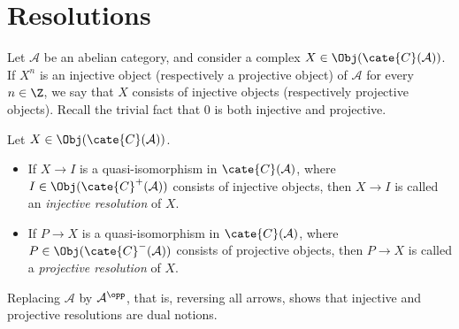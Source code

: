 
\section{Resolutions}\label{sec:resolutions}
\hypertarget{o014.aljabr2.chapter3.resolutions}{ }

Let $\mathcal{A}$ be an abelian category, and consider a complex
$X\in\Obj(\cate{C}(\mathcal{A}))$. If $X^n$ is an injective object
(respectively a projective object) of $\mathcal{A}$ for every $n\in\Z$, we say
that $X$ consists of injective objects (respectively projective objects). Recall
the trivial fact that $0$ is both injective and projective.

\begin{definition}\label{def:resolutions}
	Let $X\in\Obj(\cate{C}(\mathcal{A}))$.
	\begin{itemize}
		\item If $X\to I$ is a quasi-isomorphism in $\cate{C}(\mathcal{A})$,
		where $I\in\Obj(\cate{C}^+(\mathcal{A}))$ consists of injective
		objects, then $X\to I$ is called an \emph{injective resolution} of $X$.
		\item If $P\to X$ is a quasi-isomorphism in $\cate{C}(\mathcal{A})$,
		where $P\in\Obj(\cate{C}^-(\mathcal{A}))$ consists of projective
		objects, then $P\to X$ is called a \emph{projective resolution} of $X$.
	\end{itemize}
\end{definition}

Replacing $\mathcal{A}$ by $\mathcal{A}^{\opp}$, that is, reversing all
arrows, shows that injective and projective resolutions are dual notions.

